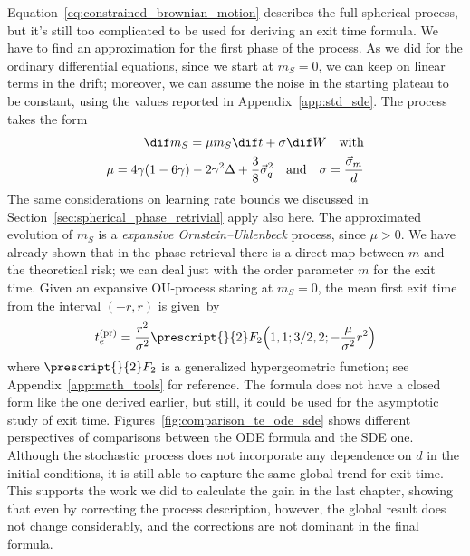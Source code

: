 Equation~\eqref{eq:constrained_brownian_motion} describes the full spherical process,
but it's still too complicated to be used for deriving an exit time formula.
We have to find an approximation for the first phase of the process. As we did 
for the ordinary differential equations, since we start at \(m_S=0\), we can keep on linear terms in the drift;
moreover, we can assume the noise in the starting plateau to be constant, using the values reported in Appendix~\ref{app:std_sde}.
The process takes the form 
\[\begin{split}
  \dif m_S = \mu m_S \dif t + \sigma \dif W \quad \text{with}\\
  \mu = 4\gamma(1-6\gamma)-2\gamma^2\Delta+\frac38 \vec{\sigma}^2_q\quad\text{and}\quad
  \sigma = \frac{\vec{\sigma}_m}{d}
\end{split}\]
The same considerations on learning rate bounds we discussed in Section~\ref{sec:spherical_phase_retrivial} apply also here.
The approximated evolution of \(m_S\) is a \emph{expansive Ornstein--Uhlenbeck} process, since \(\mu>0\).
We have already shown that in the phase retrieval there is a direct map between \(m\) and the theoretical risk;
we can deal just with the order parameter \(m\) for the exit time. 
Given an expansive OU-process staring at \(m_S=0\), the mean first exit time from the interval \((-r,r)\) is given~by~\cite{zeng2020mean}
\[
  t^{(\text{pr})}_e = \frac{r^2}{\sigma^2} \prescript{}{2}F_2{
    \left(1,1; 3/2,2; 
  -\frac{\mu}{\sigma^2}r^2\right)}
\]
where \(\prescript{}{2}F_2\) is a generalized hypergeometric function;
see Appendix~\ref{app:math_tools} for reference.
The formula does not have a closed form like the one derived earlier,
but still, it could be used for the asymptotic study of exit time.
Figures~\ref{fig:comparison_te_ode_sde} shows different perspectives of comparisons 
between the ODE formula and the SDE one. Although the stochastic process does not incorporate
any dependence on \(d\) in the initial conditions, it is still able to capture the same global trend for exit time.
This supports the work we did to calculate the gain in the last chapter,
showing that even by correcting the process description, however, 
the global result does not change considerably, and the corrections are not dominant in the final formula.
